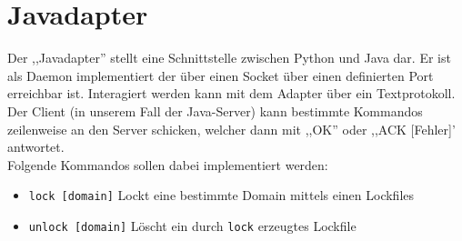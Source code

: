 

\section{Javadapter} 
\label{sec:javadapter}
Der ,,Javadapter'' stellt eine Schnittstelle zwischen Python und Java dar. Er ist als Daemon implementiert der über einen Socket über einen definierten Port
erreichbar ist. Interagiert werden kann mit dem Adapter über ein Textprotokoll. Der Client (in unserem Fall der Java-Server) kann bestimmte Kommandos
zeilenweise an den Server schicken, welcher dann mit ,,OK'' oder ,,ACK [Fehler]' antwortet.
\\
Folgende Kommandos sollen dabei implementiert werden:
\begin{itemize}
    \item \texttt{lock [domain]}
        Lockt eine bestimmte Domain mittels einen Lockfiles
    \item \texttt{unlock [domain]}
        Löscht ein durch \texttt{lock} erzeugtes Lockfile
\end{itemize}
